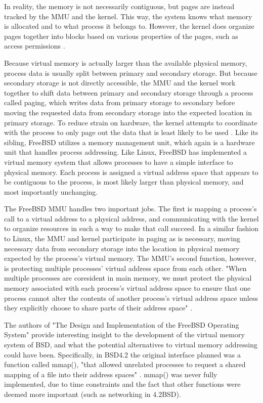 \documentclass[10pt,draftclsnofoot,onecolumn]{IEEEtran}
\begin{document}
    In reality, the memory is not necessarily contiguous, but pages are instead tracked by the MMU and the kernel. This way, the system knows what memory is allocated and to what process it belongs to. However, the kernel does organize pages together into blocks based on various properties of the pages, such as access permissions \cite{love_2014}.\par
    Because virtual memory is actually larger than the available physical memory, process data is usually split between primary and secondary storage. But because secondary storage is not directly accessible, the MMU and the kernel work together to shift data between primary and secondary storage through a process called paging, which writes data from primary storage to secondary before moving the requested data from secondary storage into the expected location in primary storage. To reduce strain on hardware, the kernel attempts to coordinate with the process to only page out the data that is least likely to be used \cite{love_2014}.
    Like its sibling, FreeBSD utilizes a memory management unit, which again is a hardware unit that handles process addressing. Like Linux, FreeBSD has implemented a virtual memory system that allows processes to have a simple interface to physical memory. Each process is assigned a virtual address space that appears to be contiguous to the process, is most likely larger than physical memory, and most importantly unchanging.\par
    The FreeBSD MMU handles two important jobs. The first is mapping a process's call to a virtual address to a physical address, and communicating with the kernel to organize resources in such a way to make that call succeed. In a similar fashion to Linux, the MMU and kernel participate in paging as is necessary, moving necessary data from secondary storage into the location in physical memory expected by the process's virtual memory. The MMU's second function, however, is protecting multiple processes' virtual address space from each other. "When multiple processes are coresident in main memory, we must protect the physical memory associated with each process’s virtual address space to ensure that one process cannot alter the contents of another process’s virtual address space unless they explicitly choose to share parts of their address space" \cite{mckusick_neville-neil_watson_mckusick_2015}.\par
    The authors of "The Design and Implementation of the FreeBSD Operating System"\cite{mckusick_neville-neil_watson_mckusick_2015} provide interesting insight to the development of the virtual memory system of BSD, and what the potential alternatives to virtual memory addressing could have been. Specifically, in BSD4.2 the original interface planned was a function called mmap(), "that allowed unrelated processes to request a shared mapping of a file into their address spaces" \cite{mckusick_neville-neil_watson_mckusick_2015}. mmap() was never fully implemented, due to time constraints and the fact that other functions were deemed more important (such as networking in 4.2BSD).\par
\end{document}
